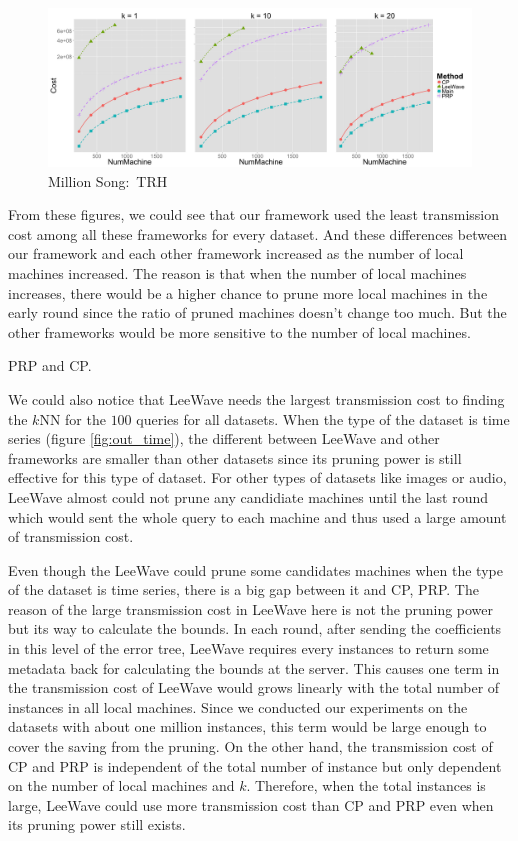 \begin{figure}[htpb!]
  \centering
  \includegraphics[width=1.0\linewidth]{exp/out/trh.png}
  \caption{Million Song:~TRH}
  \label{fig:out_trh}
\end{figure}

From these figures, we could see that our framework used the least transmission cost among all these frameworks for every dataset.  And these differences between our framework and each other framework increased as the number of local machines increased.  The reason is that when the number of local machines increases, there would be a higher chance to prune more local machines in the early round since the ratio of pruned machines doesn't change too much.  But the other frameworks would be more sensitive to the number of local machines.

PRP and CP.



We could also notice that LeeWave needs the largest transmission cost to finding the $k$NN for the $100$ queries for all datasets.  When the type of the dataset is time series (figure \ref{fig:out_time}), the different between LeeWave and other frameworks are smaller than other datasets since its pruning power is still effective for this type of dataset. For other types of datasets like images or audio, LeeWave almost could not prune any candidiate machines until the last round which would sent the whole query to each machine and thus used a large amount of transmission cost. 

Even though the LeeWave could prune some candidates machines when the type of the dataset is time series, there is a big gap between it and CP, PRP.  The reason of the large transmission cost in LeeWave here is not the pruning power but its way to calculate the bounds.  In each round, after sending the coefficients in this level of the error tree, LeeWave requires every instances to return some metadata back for calculating the bounds at the server.  This causes one term in the transmission cost of LeeWave would grows linearly with the total number of instances in all local machines.  Since we conducted our experiments on the datasets with about one million instances, this term would be large enough to cover the saving from the pruning.  On the other hand, the transmission cost of CP and PRP is independent of the total number of instance but only dependent on the number of local machines and $k$.  Therefore, when the total instances is large, LeeWave could use more transmission cost than CP and PRP even when its pruning power still exists.


